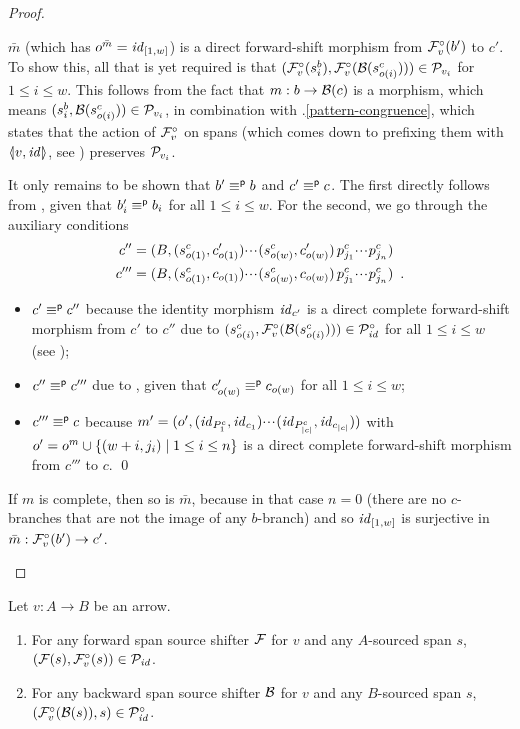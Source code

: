 \begin{proof}
\begin{enumerate}[topsep=\smallskipamount]
\smallskip
$\bar m$ (which has $o^{\bar m}=\mathit{id}_{[1,w]}$) is a direct forward-shift morphism from $\mathcal{F}^\circ_{v}(b')$ to $c'$. To show this, all that is yet required is that $(\mathcal{F}^\circ_{v}(s^b_i),\mathcal{F}^\circ_{v}(\mathcal{B}(s^c_{o(i)}))) \in \mathcal{P}_{v_i}$ for $1\leq i\leq w$. This follows from the fact that $m:b\to \mathcal{B}(c)$ is a morphism, which means $(s^b_i,\mathcal{B}(s^c_{o(i)}))\in \mathcal{P}_{v_i}$, in combination with .\ref{pattern-congruence}, which states that the action of $\mathcal{F}^\circ_{v}$ on spans (which comes down to prefixing them with $\spanof{v}{\id}$, see ) preserves $\mathcal{P}_{v_i}$.

\smallskip
It only remains to be shown that $b'\equiv^{\mathsf p} b$ and $c'\equiv^{\mathsf p} c$. The first directly follows from , given that $b'_i\equiv^{\mathsf p} b_i$ for all $1\leq i\leq w$. For the second, we go through the auxiliary conditions
\begin{align*}
c''=\;&(B,(s^c_{o(1)},c'_{o(1)}){\cdotp\mkern-2mu\cdotp\mkern-2mu\cdotp\mkern1mu} (s^c_{o(w)},c'_{o(w)})\,p^c_{j_1}{\cdotp\mkern-2mu\cdotp\mkern-2mu\cdotp\mkern1mu} p^c_{j_n}) \\
c'''=\;&(B,(s^c_{o(1)},c_{o(1)}){\cdotp\mkern-2mu\cdotp\mkern-2mu\cdotp\mkern1mu} (s^c_{o(w)},c_{o(w)})\,p^c_{j_1}{\cdotp\mkern-2mu\cdotp\mkern-2mu\cdotp\mkern1mu} p^c_{j_n}) \enspace.
\end{align*}
\begin{itemize}
\item $c'\equiv^{\mathsf p} c''$ because the identity morphism $\mathit{id}_{c'}$ is a direct complete forward-shift morphism from $c'$ to $c''$ due to $(s^c_{o(i)},\mathcal{F}^\circ_{v}(\mathcal{B}(s^c_{o(i)})))\in \mathcal{P}^\circ_{\mathit{id}}$  for all $1\leq i\leq w$ (see );
\item $c''\equiv^{\mathsf p} c'''$ due to , given that $c'_{o(w)}\equiv^{\mathsf p} c_{o(w)}$ for all $1\leq i\leq w$; 
\item $c'''\equiv^{\mathsf p} c$ because $m'=(o',(\mathit{id}_{P^c_1},\mathit{id}_{c_1}){\cdotp\mkern-2mu\cdotp\mkern-2mu\cdotp\mkern1mu} (\mathit{id}_{P^c_{|c|}},\mathit{id}_{c_{|c|}}))$ with $o'=o^m\cup\{{(w+i,j_i) \mid 1\leq i\leq n}\}$ is a direct complete forward-shift morphism from $c'''$ to $c$.
\qed
\end{itemize}
If $m$ is complete, then so is $\bar m$, because in that case $n=0$ (there are no $c$-branches that are not the image of any $b$-branch) and so $\mathit{id}_{[1,w]}$ is surjective in $\bar m:\mathcal{F}^\circ_{v}(b')\to c'$.
\end{enumerate}
\end{proof}
%
\begin{lemma}
Let $v:A\to B$ be an arrow.
\begin{enumerate}[topsep=\smallskipamount]
\item For any forward span source shifter $\mathcal{F}$ for $v$ and any $A$-sourced span $s$, $(\mathcal{F}(s),\mathcal{F}^\circ_{v}(s))\in \mathcal{P}_{\mathit{id}}$.
\item For any backward span source shifter $\mathcal{B}$ for $v$ and any $B$-sourced span $s$, $(\mathcal{F}^\circ_{v}(\mathcal{B}(s)),s)\in \mathcal{P}^\circ_{\mathit{id}}$.
\end{enumerate}
\end{lemma}
